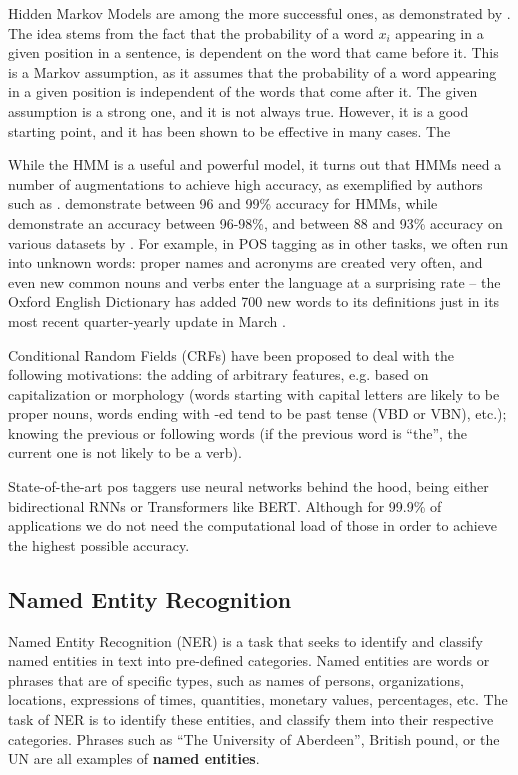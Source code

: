 Hidden Markov Models are among the more successful ones, as demonstrated by \cite{schutze1994part,thede1999second,nigam1999maximumentropy}. The idea stems from the fact that the probability of a word $x_i$ appearing in a given position in a sentence, is dependent on the word that came before it. This is a Markov assumption, as it assumes that the probability of a word appearing in a given position is independent of the words that come after it. The given assumption is a strong one, and it is not always true. However, it is a good starting point, and it has been shown to be effective in many cases. The 

While the HMM is a useful and powerful model, it turns out that HMMs need a number of augmentations to achieve high accuracy, as exemplified by authors such as \cite{goldberg2008can}. \cite{10.3115/974147.974178postaggingmarkov} demonstrate between 96 and 99\% accuracy for HMMs, while \cite{thede1999second} demonstrate an accuracy between 96-98\%, and between 88 and 93\% accuracy on various datasets by \cite{goldberg2008can}. For example, in POS tagging as in other tasks, we often run into unknown words: proper names and acronyms are created very often, and even new common nouns and verbs enter the language at a surprising rate -- the Oxford English Dictionary has added 700 new words to its definitions just in its most recent quarter-yearly update in March \citep{oed2023englishupdates}. 

Conditional Random Fields (CRFs) have been proposed to deal with the following motivations: the adding of arbitrary features, e.g. based on capitalization or morphology (words starting with capital letters are likely to be proper nouns, words ending with -ed tend to be past tense (VBD or VBN), etc.); knowing the previous or following words (if the previous word is ``the'', the current one is not likely to be a verb).

State-of-the-art \acrshort{pos} taggers use neural networks behind the hood, being either bidirectional RNNs or Transformers like BERT. Although for 99.9\% of applications we do not need the computational load of those in order to achieve the highest possible accuracy.

\subsection{Named Entity Recognition}
Named Entity Recognition (NER) is a task that seeks to identify and classify named entities in text into pre-defined categories. Named entities are words or phrases that are of specific types, such as names of persons, organizations, locations, expressions of times, quantities, monetary values, percentages, etc. The task of NER is to identify these entities, and classify them into their respective categories. Phrases such as ``The University of Aberdeen'', British pound, or the UN are all examples of \textbf{named entities}.

